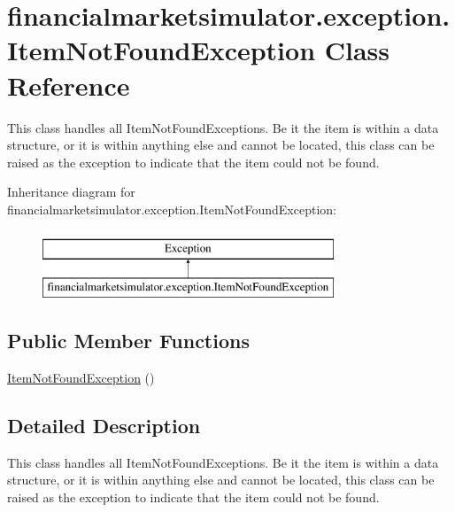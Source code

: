 \hypertarget{classfinancialmarketsimulator_1_1exception_1_1_item_not_found_exception}{\section{financialmarketsimulator.\+exception.\+Item\+Not\+Found\+Exception Class Reference}
\label{classfinancialmarketsimulator_1_1exception_1_1_item_not_found_exception}
}


This class handles all Item\+Not\+Found\+Exceptions. Be it the item is within a data structure, or it is within anything else and cannot be located, this class can be raised as the exception to indicate that the item could not be found.  


Inheritance diagram for financialmarketsimulator.\+exception.\+Item\+Not\+Found\+Exception\+:\begin{figure}[H]
\begin{center}
\leavevmode
\includegraphics[height=2.000000cm]{classfinancialmarketsimulator_1_1exception_1_1_item_not_found_exception}
\end{center}
\end{figure}
\subsection*{Public Member Functions}
\begin{DoxyCompactItemize}
\item 
\hyperlink{classfinancialmarketsimulator_1_1exception_1_1_item_not_found_exception_ad13688b2ff9a73a82d3254a7ae8f7523}{Item\+Not\+Found\+Exception} ()
\end{DoxyCompactItemize}


\subsection{Detailed Description}
This class handles all Item\+Not\+Found\+Exceptions. Be it the item is within a data structure, or it is within anything else and cannot be located, this class can be raised as the exception to indicate that the item could not be found. 

